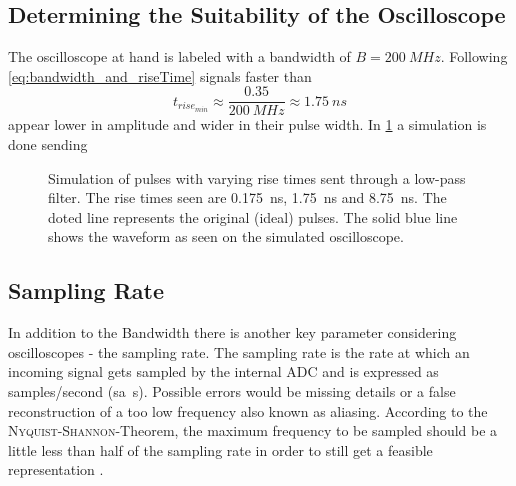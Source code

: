     \subsection{Determining the Suitability of the Oscilloscope}\label{sec:A5_oscopes_suitability}%
        The oscilloscope at hand is labeled with a bandwidth of \( B = \SI{200}{MHz} \). Following \cref{eq:bandwidth_and_riseTime}
        signals faster than
        \begin{equation}
            t_{rise_{min}} \approx \frac{0.35}{\SI{200}{MHz}} \approx \SI{1.75}{ns}
        \end{equation}
        appear lower in amplitude and wider in their pulse width. In \cref{fig:low-pass-simulation} a simulation is done
        sending 
        \begin{figure}[h]
            \centering
            
            \caption[Simulation of pulses with varying rise times]{Simulation of pulses with varying rise times sent through a low-pass filter. The rise times seen are \SI{0.175}{ns}, \SI{1.75}{ns} and \SI{8.75}{ns}.
            The doted line represents the original (ideal) pulses. The solid blue line shows the waveform as seen on the simulated oscilloscope.}
            \label{fig:low-pass-simulation}
        \end{figure}
    \subsection{Sampling Rate}%
    In addition to the Bandwidth there is another key parameter considering oscilloscopes - the sampling rate. The sampling rate
    is the rate at which an incoming signal gets sampled by the internal ADC and is expressed as samples/second (\SI{sa}{s}). Possible
    errors would be missing details or a false reconstruction of a too low frequency also known as aliasing.
    According to the \textsc{Nyquist-Shannon}-Theorem, the maximum frequency to be sampled should be a little less than
    half of the sampling rate in order to still get a feasible representation \cite{Eichler.2016}. 
